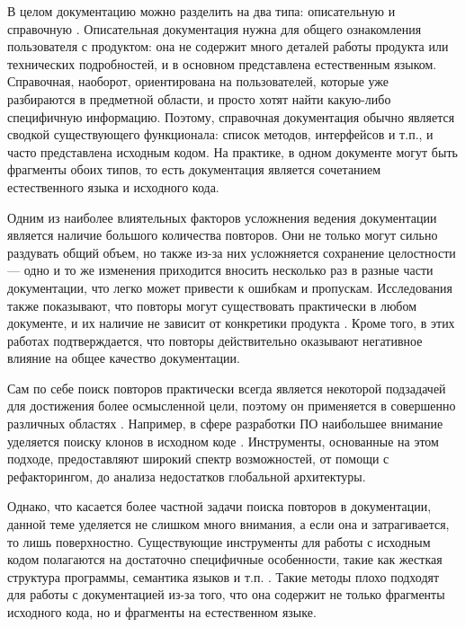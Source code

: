 \documentclass[14pt]{matmex-diploma-custom}
\begin{document}
В целом документацию можно разделить на два типа: описательную и справочную \cite{bib:art:DocumTypes}. Описательная документация нужна для общего ознакомления пользователя с продуктом: она не содержит много деталей работы продукта или технических подробностей, и в основном представлена естественным языком. Справочная, наоборот, ориентирована на пользователей, которые уже разбираются в предметной области, и просто хотят найти какую-либо специфичную информацию. Поэтому, справочная документация обычно является сводкой существующего функционала: список методов, интерфейсов и т.п., и часто представлена исходным кодом. На практике, в одном документе могут быть фрагменты обоих типов, то есть документация является сочетанием естественного языка и исходного кода.

Одним из наиболее влиятельных факторов усложнения ведения документации является наличие большого количества повторов. Они не только могут сильно раздувать общий объем, но также из-за них усложняется сохранение целостности --- одно и то же изменения приходится вносить несколько раз в разные части документации, что легко может привести к ошибкам и пропускам. Исследования также показывают, что повторы могут существовать практически в любом документе, и их наличие не зависит от конкретики продукта \cite{bib:art:JuergensCloneDetect, bib:art:DuplicatesStudy}. Кроме того, в этих работах подтверждается, что повторы действительно оказывают негативное влияние на общее качество документации.

Сам по себе поиск повторов практически всегда является некоторой подзадачей для достижения более осмысленной цели, поэтому он применяется в совершенно различных областях \cite{bib:art:NearDupSurvey}. Например, в сфере разработки ПО наибольшее внимание уделяется поиску клонов в исходном коде \cite{bib:art:SoftwareClonesSurvey}. Инструменты, основанные на этом подходе, предоставляют широкий спектр возможностей, от помощи с рефакторингом, до анализа недостатков глобальной архитектуры.

Однако, что касается более частной задачи поиска повторов в документации, данной теме уделяется не слишком много внимания, а если она и затрагивается, то лишь поверхностно. Существующие инструменты для работы с исходным кодом полагаются на достаточно специфичные особенности, такие как жесткая структура программы, семантика языков и т.п. \cite{bib:tool:ASTSearch, bib:tool:ASTRefactor, bib:tool:ASTSuffix}. Такие методы плохо подходят для работы с документацией из-за того, что она содержит не только фрагменты исходного кода, но и фрагменты на естественном языке.
\end{document}
